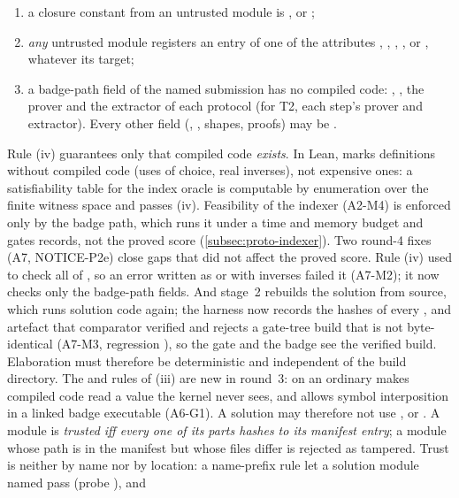 \begin{enumerate}[leftmargin=1.5em,itemsep=2pt]
\begin{enumerate}[label=(\roman*),nosep]
  \item a closure constant from an untrusted module is ,  or
    ;
  \item \emph{any} untrusted module registers an entry of one of the attributes
    , , , ,  or
    , whatever its target;
  \item a badge-path field of the named submission has no compiled code: , ,
    the prover and the extractor of each protocol (for T2, each step's prover and extractor). Every
    other field (, , shapes, proofs) may be .
  \end{enumerate}
  Rule (iv) guarantees only that compiled code \emph{exists}. In Lean,  marks
  definitions without compiled code (uses of choice, real inverses), not expensive ones: a
  satisfiability table for the index oracle is computable by enumeration over the finite witness
  space and passes (iv). Feasibility of the indexer (A2-M4) is enforced only by the badge path, which
  runs it under a time and memory budget and gates records, not the proved score
  (\cref{subsec:proto-indexer}). Two round-4 fixes (A7, NOTICE-P2e) close gaps that did not affect
  the proved score. Rule (iv) used to check all of , so an error written as
   or with  inverses failed it (A7-M2); it now checks only the badge-path
  fields. And stage~2 rebuilds the solution from source, which runs solution code again; the harness
  now records the hashes of every ,  and  artefact that comparator
  verified and rejects a gate-tree build that is not byte-identical (A7-M3, regression
  ), so the gate and the badge see the verified build. Elaboration must therefore be
  deterministic and independent of the build directory. The  and 
  rules of (iii) are new in round~3:  on an ordinary  makes compiled code
  read a value the kernel never sees, and  allows symbol interposition in a linked
  badge executable (A6-G1). A solution may therefore not use ,
   or . A module is \emph{trusted iff every one of its
   parts hashes to its manifest entry}; a module whose path is in the manifest but whose
  files differ is rejected as tampered. Trust is neither by name nor by location: a name-prefix rule
  let a solution module named  pass (probe ), and

\end{enumerate}
